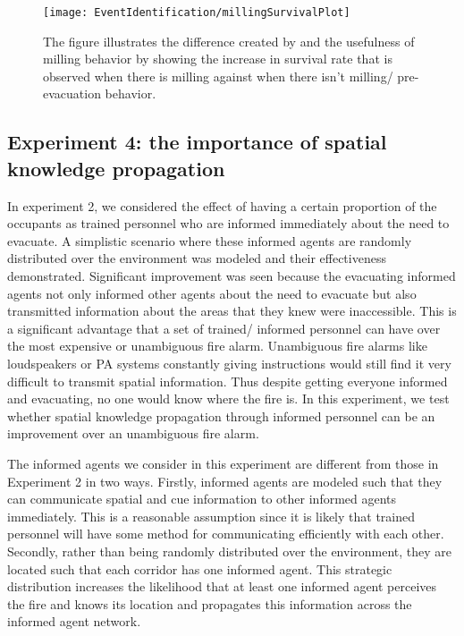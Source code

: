 

\begin{figure}[!t]
	\begin{center}
		\texttt{[image: EventIdentification/millingSurvivalPlot]}
	\end{center}
	\caption[Experiment 3: The importance of milling]{The figure illustrates the difference created by and the usefulness of milling behavior by showing the increase in survival rate that is observed when there is milling against when there isn't milling/ pre-evacuation behavior.}
	\label{fig:MillingSurvivalPlot}
\end{figure}

\subsection{Experiment 4: the importance of spatial knowledge propagation} %
\label{sec:experiment_4}



In experiment 2, we considered the effect of having a certain proportion of the occupants as trained personnel who are informed immediately about the need to evacuate. A simplistic scenario where these informed agents are randomly distributed over the environment was modeled and their effectiveness demonstrated. Significant improvement was seen because the evacuating informed agents not only informed other agents about the need to evacuate but also transmitted information about the areas that they knew were inaccessible. This is a significant advantage that a set of trained/ informed personnel can have over the most expensive or unambiguous fire alarm. Unambiguous fire alarms like loudspeakers or PA systems constantly giving instructions would still find it very difficult to transmit spatial information. Thus despite getting everyone informed and evacuating, no one would know where the fire is. In this experiment, we test whether spatial knowledge propagation through informed personnel can be an improvement over an unambiguous fire alarm.

The informed agents we consider in this experiment are different from those in Experiment 2 in two ways. Firstly, informed agents are modeled such that they can communicate spatial and cue information to other informed agents immediately. This is a reasonable assumption since it is likely that trained personnel will have some method for communicating efficiently with each other. Secondly, rather than being randomly distributed over the environment, they are located such that each corridor has one informed agent. This strategic distribution increases the likelihood that at least one informed agent perceives the fire and knows its location and propagates this information across the informed agent network.

